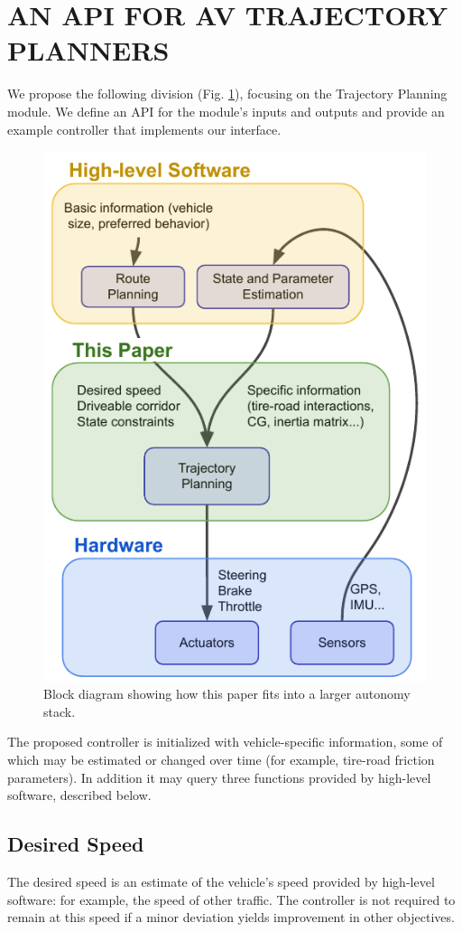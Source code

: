 \documentclass[letterpaper, 10 pt, conference]{ieeeconf}  %
\begin{document}
\section{AN API FOR AV TRAJECTORY PLANNERS}

We propose the following division (Fig. \ref{fig:block}), focusing on the Trajectory Planning module. We define an API for the module's inputs and outputs and provide an example controller that implements our interface.

\begin{figure}[h]
	\centering
	\includegraphics[width=0.85\linewidth]{figures/block_diagram.pdf}
	\caption{Block diagram showing how this paper fits into a larger autonomy stack.}
	\label{fig:block}
\end{figure}

The proposed controller is initialized with vehicle-specific information, some of which may be estimated or changed over time (for example, tire-road friction parameters). In addition it may query three functions provided by high-level software, described below.

\subsection{Desired Speed}
The desired speed is an estimate of the vehicle's speed provided by high-level software: for example, the speed of other traffic. The controller is not required to remain at this speed if a minor deviation yields improvement in other objectives.
\end{document}
